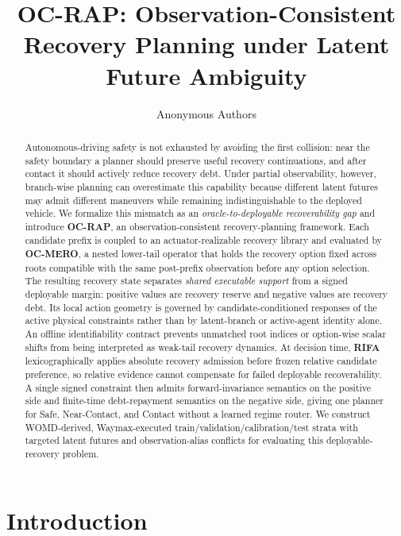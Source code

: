 \documentclass{article} %
\title{OC-RAP: Observation-Consistent Recovery Planning under Latent Future Ambiguity}
\author{Anonymous Authors}
\begin{document}
\maketitle

\begin{abstract}
Autonomous-driving safety is not exhausted by avoiding the first collision: near the safety boundary a planner should preserve useful recovery continuations, and after contact it should actively reduce recovery debt. Under partial observability, however, branch-wise planning can overestimate this capability because different latent futures may admit different maneuvers while remaining indistinguishable to the deployed vehicle. We formalize this mismatch as an \emph{oracle-to-deployable recoverability gap} and introduce \textbf{OC-RAP}, an observation-consistent recovery-planning framework. Each candidate prefix is coupled to an actuator-realizable recovery library and evaluated by \textbf{OC-MERO}, a nested lower-tail operator that holds the recovery option fixed across roots compatible with the same post-prefix observation before any option selection. The resulting recovery state separates \emph{shared executable support} from a signed deployable margin: positive values are recovery reserve and negative values are recovery debt. Its local action geometry is governed by candidate-conditioned responses of the active physical constraints rather than by latent-branch or active-agent identity alone. An offline identifiability contract prevents unmatched root indices or option-wise scalar shifts from being interpreted as weak-tail recovery dynamics. At decision time, \textbf{RIFA} lexicographically applies absolute recovery admission before frozen relative candidate preference, so relative evidence cannot compensate for failed deployable recoverability. A single signed constraint then admits forward-invariance semantics on the positive side and finite-time debt-repayment semantics on the negative side, giving one planner for Safe, Near-Contact, and Contact without a learned regime router. We construct WOMD-derived, Waymax-executed train/validation/calibration/test strata with targeted latent futures and observation-alias conflicts for evaluating this deployable-recovery problem.
\end{abstract}

\section{Introduction}
\label{sec:introduction}
\end{document}
